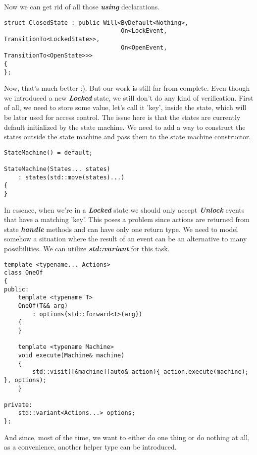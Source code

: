 \documentclass{article}[8pt]
\newcommand{\code}[1]{\textbf{\textit{#1}}}
\newcommand{\locked}{\code{Locked}}
\newcommand{\unlock}{\code{Unlock}}
\begin{document}
\bigskip
\inputminted[firstline=3]{c++}{../fsm/actions/Will.h}
\bigskip

Now we can get rid of all those \code{using} declarations.

\bigskip
\begin{verbatim}
struct ClosedState : public Will<ByDefault<Nothing>,
                                 On<LockEvent, TransitionTo<LockedState>>,
                                 On<OpenEvent, TransitionTo<OpenState>>>
{
};
\end{verbatim}
\bigskip

Now, that's much better :). But our work is still far from complete. Even though we introduced a new \locked{} state, we still don't do any kind of verification. First of all, we need to store some value, let's call it 'key', inside the state, which will be later used for access control. The issue here is that the states are currently default initialized by the state machine. We need to add a way to construct the states outside the state machine and pass them to the state machine constructor.

\bigskip
\begin{verbatim}
StateMachine() = default;

StateMachine(States... states)
    : states(std::move(states)...)
{
}
\end{verbatim}
\bigskip

In essence, when we're in a \locked{} state we should only accept \unlock{} events that have a matching 'key'. This poses a problem since actions are returned from state \code{handle} methods and can have only one return type. We need to model somehow a situation where the result of an event can be an alternative to many possibilities. We can utilize \code{std::variant} for this task.

\bigskip
\begin{verbatim}
template <typename... Actions>
class OneOf
{
public:
    template <typename T>
    OneOf(T&& arg)
        : options(std::forward<T>(arg))
    {
    }

    template <typename Machine>
    void execute(Machine& machine)
    {
        std::visit([&machine](auto& action){ action.execute(machine); }, options);
    }

private:
    std::variant<Actions...> options;
};
\end{verbatim}
\bigskip

And since, most of the time, we want to either do one thing or do nothing at all, as a convenience, another helper type can be introduced.
\end{document}
